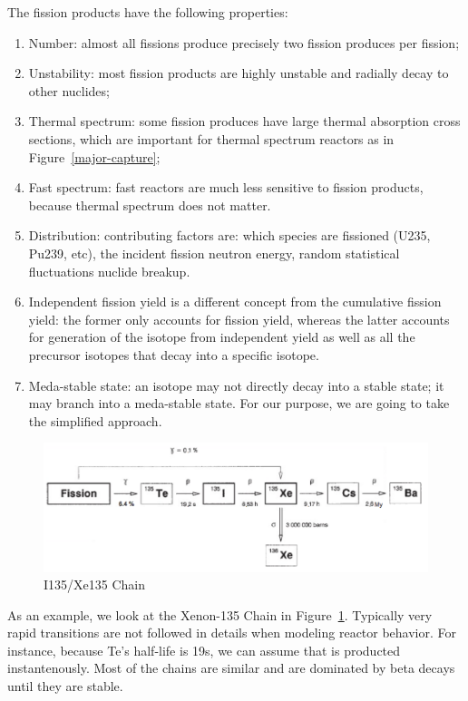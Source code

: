 \documentclass{school-22.211-notes}
\begin{document}
The fission products have the following properties: 
\begin{enumerate}
\item Number: almost all fissions produce precisely two fission produces per fission;
\item Unstability: most fission products are highly unstable and radially decay to other nuclides;
\item Thermal spectrum: some fission produces have large thermal absorption cross sections, which are important for thermal spectrum reactors as in Figure~\ref{major-capture};
\item Fast spectrum: fast reactors are much less sensitive to fission products, because thermal spectrum does not matter. 
\item Distribution: contributing factors are: which species are fissioned (U235, Pu239, etc), the incident fission neutron energy, random statistical fluctuations nuclide breakup.
\item Independent fission yield is a different concept from the cumulative fission yield: the former only accounts for fission yield, whereas the latter accounts for generation of the isotope from independent yield as well as all the precursor isotopes that decay into a specific isotope. 
\item Meda-stable state: an isotope may not directly decay into a stable state; it may branch into a meda-stable state. For our purpose, we are going to take the simplified approach.
\end{enumerate}
\begin{figure}
  \centering
  \includegraphics[width=5in]{images/dfs/Xe135.png}
  \caption{I135/Xe135 Chain} \label{Xe135} 
\end{figure}

As an example, we look at the Xenon-135 Chain in Figure~\ref{Xe135}. Typically very rapid transitions are not followed in details when modeling reactor behavior. For instance, because Te's half-life is 19s, we can assume that  is producted instantenously. Most of the chains are similar and are dominated by beta decays until they are stable. 
\end{document}
